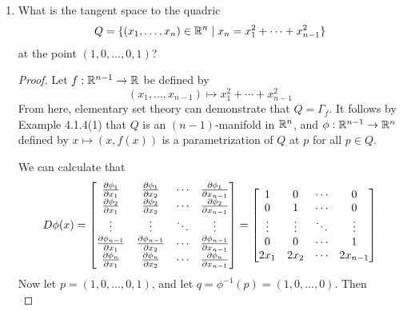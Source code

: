 \documentclass[../psets.tex]{subfiles}
\begin{document}
\begin{enumerate}[label={\textbf{4.2.\roman*.}}]
    \item What is the tangent space to the quadric
    \begin{equation*}
        Q = \{(x_1,\dots,x_n)\in\mathbb{R}^n\mid x_n=x_1^2+\cdots+x_{n-1}^2\}
    \end{equation*}
    at the point $(1,0,\dots,0,1)$?
    \begin{proof}
        Let $f:\mathbb{R}^{n-1}\to\mathbb{R}$ be defined by
        \begin{equation*}
            (x_1,\dots,x_{n-1}) \mapsto x_1^2+\cdots+x_{n-1}^2
        \end{equation*}
        From here, elementary set theory can demonstrate that $Q=\Gamma_f$. It follows by Example 4.1.4(1) that $Q$ is an $(n-1)$-manifold in $\mathbb{R}^n$, and $\phi:\mathbb{R}^{n-1}\to\mathbb{R}^{n}$ defined by $x\mapsto(x,f(x))$ is a parametrization of $Q$ at $p$ for all $p\in Q$.\par
        We can calculate that
        \begin{equation*}
            D\phi(x) =
            \begin{bmatrix}
                \pdv{\phi_1}{x_1} & \pdv{\phi_1}{x_2} & \cdots & \pdv{\phi_1}{x_{n-1}}\\
                \pdv{\phi_2}{x_1} & \pdv{\phi_2}{x_2} & \cdots & \pdv{\phi_2}{x_{n-1}}\\
                \vdots & \vdots & \ddots & \vdots\\
                \pdv{\phi_{n-1}}{x_1} & \pdv{\phi_{n-1}}{x_2} & \cdots & \pdv{\phi_{n-1}}{x_{n-1}}\\
                \pdv{\phi_n}{x_1} & \pdv{\phi_n}{x_2} & \cdots & \pdv{\phi_n}{x_{n-1}}\\
            \end{bmatrix}
            =
            \begin{bmatrix}
                1 & 0 & \cdots & 0\\
                0 & 1 & \cdots & 0\\
                \vdots & \vdots & \ddots & \vdots\\
                0 & 0 & \cdots & 1\\
                2x_1 & 2x_2 & \cdots & 2x_{n-1}\\
            \end{bmatrix}
        \end{equation*}
        Now let $p=(1,0,\dots,0,1)$, and let $q=\phi^{-1}(p)=(1,0,\dots,0)$. Then
        \begin{equation*}

\end{equation*}
\end{proof}
\end{enumerate}
\end{document}
